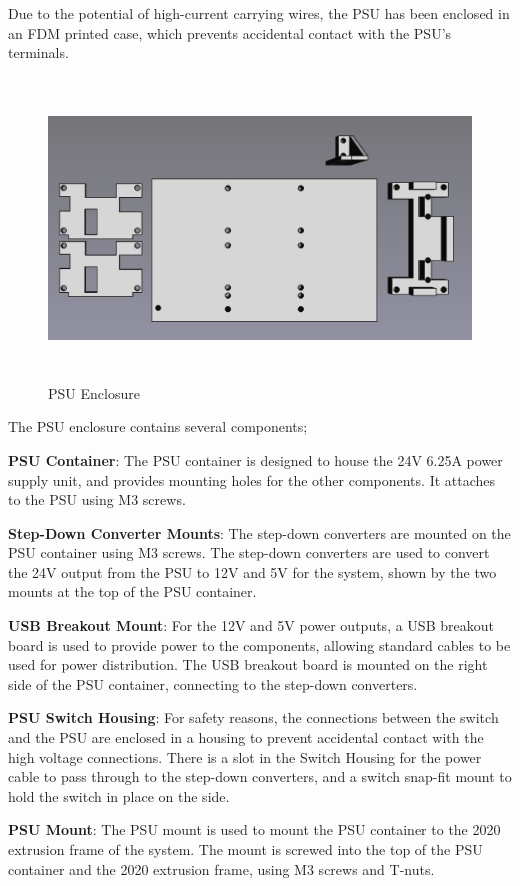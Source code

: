 Due to the potential of high-current carrying wires, the PSU has been enclosed in an FDM printed case, which prevents accidental contact with the PSU's terminals.

\begin{figure}[H]
    \hfill
    \begin{minipage}[h]{0.95\textwidth}
        \centering
        \includegraphics[height=8cm]{imgs/freecad/psu_mount.jpg}
        \caption{PSU Enclosure}
    \end{minipage}
    \hfill
\end{figure}

The PSU enclosure contains several components;
\par
\textbf{PSU Container}: The PSU container is designed to house the 24V 6.25A power supply unit, and provides mounting holes for the other components. It attaches to the PSU using M3 screws.
\par
\textbf{Step-Down Converter Mounts}: The step-down converters are mounted on the PSU container using M3 screws. The step-down converters are used to convert the 24V output from the PSU to 12V and 5V for the system, shown by the two mounts at the top of the PSU container.
\par
\textbf{USB Breakout Mount}: For the 12V and 5V power outputs, a USB breakout board is used to provide power to the components, allowing standard cables to be used for power distribution. The USB breakout board is mounted on the right side of the PSU container, connecting to the step-down converters.
\par
\textbf{PSU Switch Housing}: For safety reasons, the connections between the switch and the PSU are enclosed in a housing to prevent accidental contact with the high voltage connections. There is a slot in the Switch Housing for the power cable to pass through to the step-down converters, and a switch snap-fit mount to hold the switch in place on the side.
\par
\textbf{PSU Mount}: The PSU mount is used to mount the PSU container to the 2020 extrusion frame of the system. The mount is screwed into the top of the PSU container and the 2020 extrusion frame, using M3 screws and T-nuts.

